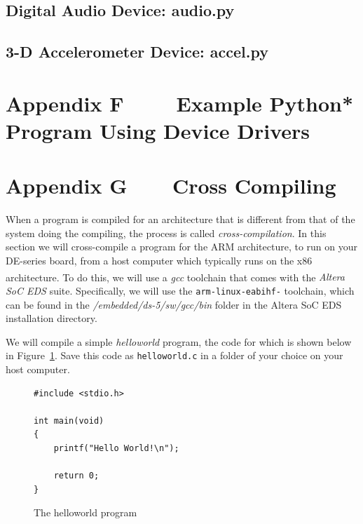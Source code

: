 \documentclass[11pt, twoside, pdftex]{article}
\begin{document}
\subsection*{Digital Audio Device: audio.py}

\newpage
\subsection*{3-D Accelerometer Device: accel.py}


\newpage
\section*{Appendix F~~~~ Example Python* Program Using Device Drivers}



\newpage
\section*{Appendix G~~~~Cross Compiling}

When a program is compiled for an architecture that is different from that of the system 
doing the compiling, the process is called {\it cross-compilation}. In this section we will 
cross-compile a program for the ARM architecture, to run on your DE-series board, from a 
host computer which typically runs on the x86 architecture. To do this, we will use a 
{\it gcc} toolchain that comes with the {\it Altera\textsuperscript{\textregistered} SoC EDS} suite. Specifically, we will use 
the \texttt{arm-linux-eabihf-} toolchain, which can be found in 
the \textit{/embedded/ds-5/sw/gcc/bin} folder in the Altera SoC EDS installation directory.

We will compile a simple {\it helloworld} program, the code for which is shown below in 
Figure~\ref{fig:helloworld_code_2}. Save this code as \texttt{helloworld.c} in a folder of 
your choice on your host computer.

\lstset{language=C,numbers=left}
\begin{figure}[H]
\begin{center}
\begin{minipage}[t]{16 cm}
\begin{lstlisting}
#include <stdio.h>

int main(void)
{
    printf("Hello World!\n");
    
    return 0;
}
\end{lstlisting}
\end{minipage}
\end{center}
\vspace{-0.33in}\caption{The helloworld program}
\label{fig:helloworld_code_2}
\end{figure}
\end{document}
